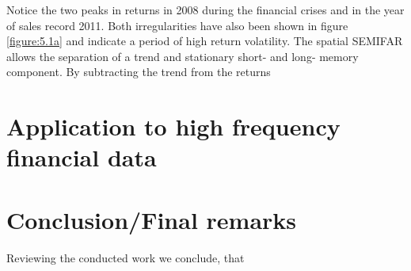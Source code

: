 \documentclass[12pt]{article}
\begin{document}
\linebreak
Notice the two peaks in returns in 2008 during the financial crises and in the year of sales record 2011. Both irregularities have also been shown in figure \ref{figure:5.1a} and indicate a period of high return volatility.
The spatial SEMIFAR allows the separation of a trend and stationary short- and long- memory component. By subtracting the trend from the returns

\section{Application to high frequency financial data}

\section{Conclusion/Final remarks}
Reviewing the conducted work we conclude, that


\printbibliography[heading=bibintoc]

\end{document}
